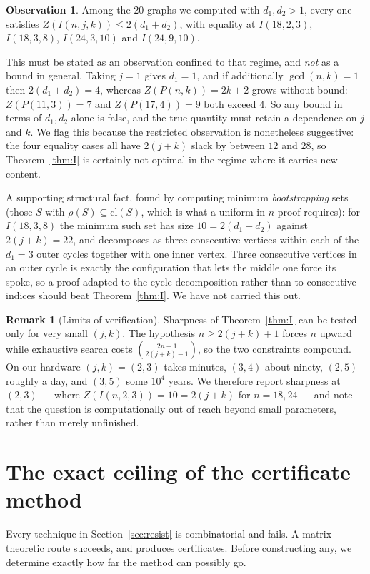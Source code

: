 \documentclass[11pt]{article}
\theoremstyle{definition}
\newtheorem{remark}[theorem]{Remark}
\newtheorem{observation}[theorem]{Observation}
\begin{document}
\begin{observation}\label{obs:gcd}
Among the $20$ graphs we computed with $d_1,d_2>1$, every one satisfies
$Z(I(n,j,k))\le 2(d_1+d_2)$, with equality at $I(18,2,3)$,
$I(18,3,8)$, $I(24,3,10)$ and $I(24,9,10)$.
\end{observation}

\noindent
This must be stated as an observation confined to that regime, and
\emph{not} as a bound in general. Taking $j=1$ gives $d_1=1$, and if
additionally $\gcd(n,k)=1$ then $2(d_1+d_2)=4$, whereas $Z(P(n,k))=2k+2$ grows
without bound: $Z(P(11,3))=7$ and $Z(P(17,4))=9$ both exceed $4$. So any
bound in terms of $d_1,d_2$ alone is false, and the true quantity must retain
a dependence on $j$ and $k$. We flag this because the restricted observation
is nonetheless suggestive: the four equality cases all have $2(j+k)$ slack by
between $12$ and $28$, so Theorem~\ref{thm:I} is certainly not optimal in the
regime where it carries new content.

A supporting structural fact, found by computing minimum \emph{bootstrapping}
sets (those $S$ with $\rho(S)\subseteq\mathrm{cl}(S)$, which is what a
uniform-in-$n$ proof requires): for $I(18,3,8)$ the minimum such set has size
$10=2(d_1+d_2)$ against $2(j+k)=22$, and decomposes as three consecutive
vertices within each of the $d_1=3$ outer cycles together with one inner
vertex. Three consecutive vertices in an outer cycle is exactly the
configuration that lets the middle one force its spoke, so a proof adapted to
the cycle decomposition rather than to consecutive indices should beat
Theorem~\ref{thm:I}. We have not carried this out.

\begin{remark}[Limits of verification]
Sharpness of Theorem~\ref{thm:I} can be tested only for very small $(j,k)$.
The hypothesis $n\ge2(j+k)+1$ forces $n$ upward while exhaustive search costs
$\binom{2n-1}{2(j+k)-1}$, so the two constraints compound. On our hardware
$(j,k)=(2,3)$ takes minutes, $(3,4)$ about ninety, $(2,5)$ roughly a day, and
$(3,5)$ some $10^4$ years. We therefore report sharpness at $(2,3)$ --- where
$Z(I(n,2,3))=10=2(j+k)$ for $n=18,24$ --- and note that the question is
computationally out of reach beyond small parameters, rather than merely
unfinished.
\end{remark}

\section{The exact ceiling of the certificate method}
Every technique in Section~\ref{sec:resist} is combinatorial and fails. A
matrix-theoretic route succeeds, and produces certificates. Before
constructing any, we determine exactly how far the method can possibly go.
\end{document}

